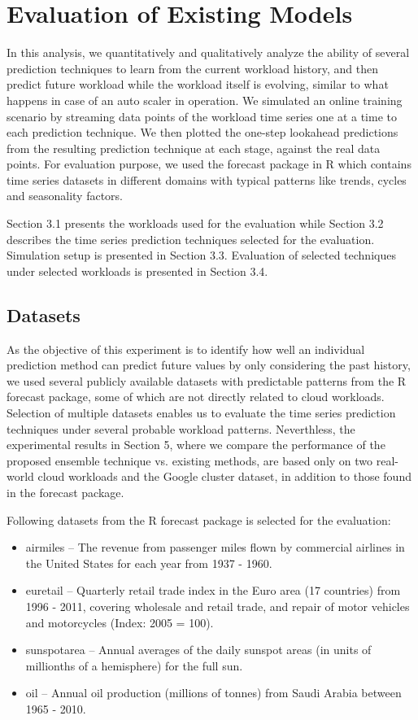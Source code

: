 \section{Evaluation of Existing Models}

In this analysis, we quantitatively and qualitatively analyze the ability of several prediction techniques to learn from the current workload history, and then predict future workload while the workload itself is evolving, similar to what happens in case of an auto scaler in operation. We simulated an online training scenario by streaming data points of the workload time series one at a time to each prediction technique. We then plotted the one-step lookahead predictions from the resulting prediction technique at each stage, against the real data points. For evaluation purpose, we used the forecast package in R \cite{forecastPackage} which contains time series datasets in different domains with typical patterns like trends, cycles and seasonality factors.

Section 3.1 presents the workloads used for the evaluation while Section 3.2 describes the time series prediction techniques selected for the evaluation. Simulation setup is presented in Section 3.3. Evaluation of selected techniques under selected workloads is presented in Section 3.4.

\subsection{Datasets}
As the objective of this experiment is to identify how well an individual prediction method can predict future values by only considering the past history, we used several publicly available datasets with predictable patterns from the R forecast package, some of which are not directly related to cloud workloads. Selection of multiple datasets enables us to evaluate the time series prediction techniques under several probable workload patterns. Neverthless, the experimental results in Section 5, where we compare the performance of the proposed ensemble technique vs. existing methods, are based only on two real-world cloud workloads and the Google cluster dataset, in addition to those found in the forecast package.

Following datasets from the R forecast package is selected for the evaluation:
\begin{itemize}
\item airmiles -- The revenue from passenger miles flown by commercial airlines in the United States for each year from 1937 - 1960.
\item euretail -- Quarterly retail trade index in the Euro area (17 countries) from 1996 - 2011, covering wholesale and retail trade, and repair of motor vehicles and motorcycles (Index: 2005 = 100).
\item sunspotarea -- Annual averages of the daily sunspot areas (in units of millionths of a hemisphere) for the full sun.
\item oil -- Annual oil production (millions of tonnes) from Saudi Arabia between 1965 - 2010.
\end{itemize}

